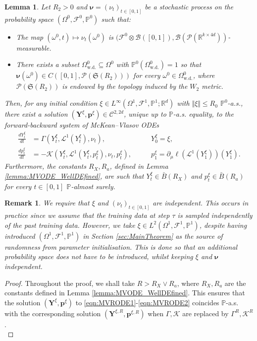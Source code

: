 \documentclass{article}
\newtheorem{lemma}[theorem]{Lemma}
\newtheorem{remark}[theorem]{Remark}
\newcommand{\R}{\mathbb{R}}
\begin{document}
\begin{appendices}
\begin{lemma}\label{lemma:MVRODE_wd}
  Let $R_2>0$ and $\bm\nu=(\nu_t)_{t\in[0,1]}$ be a stochastic process on the probability space $(\Omega^0,\mathcal F^0,\mathbb P^0)$ such that:
\begin{itemize}
    \item The map $(\omega^0,t) \mapsto \nu_t(\omega^0)$ is $(\mathcal F^0\otimes \mathcal B([0,1]), \mathcal B(\mathcal P(\R^{k\times 4d}))$-measurable.
    \item There exists a subset $\Omega^0_\mathrm{w.d.}\subseteq\Omega^0$ with $\mathbb P^0(\Omega^0_\mathrm{w.d.})=1$ so that $\bm\nu(\omega^0)\in C([0,1],\mathcal P(\mathfrak{S}(R_2)) )$ for every $\omega^0\in \Omega^0_\mathrm{w.d.}$, where $\mathcal P(\mathfrak S(R_2))$ is endowed by the topology induced by the $W_2$ metric.
\end{itemize}
Then, for any initial condition $\xi\in L^\infty(\Omega^1,\mathcal F^1,\mathbb P^1;\R^d)$ with $\Vert \xi\Vert \le R_0$ $\mathbb P^0$-a.s., there exist a solution $(\bm{Y}^\xi,\bm{p}^\xi)\in \mathscr{C}^{2,2d}$, unique up to $\mathbb P$-a.s. equality, to the forward-backward system of McKean--Vlasov ODEs
\begin{align}
    \frac{dY^{\xi}_t}{dt} &= \Gamma(Y^\xi_t,\mathcal L^1(Y^\xi_t),\nu_t), \qquad &Y^\xi_0 =\xi,\label{eqn:MVRODE1}\\
    \frac{d p^{\xi}_t}{dt} &= - \mathcal K(Y^\xi_t,\mathcal L^1(Y^\xi_t,p^\xi_t),\nu_t,p^\xi_t), \qquad &p^\xi_1 = \partial_\mu\ell(\mathcal L^1(Y^\xi_1))(Y^\xi_1).\label{eqn:MVRODE2}
\end{align}
Furthermore, the constants $R_X,R_a$, defined in Lemma \ref{lemma:MVODE_WellDEfined}, are such that $Y_t^\xi\in \bar B(R_X)$ and $p^\xi_t\in \bar B(R_a)$ for every $t\in[0,1]$ $\mathbb P$-almost surely.
\end{lemma}
\begin{remark}
We require that $\xi$ and $(\nu_t)_{t\in[0,1]}$ are independent. This occurs in practice since we assume that the training data at step $\tau$ is sampled independently of the past training data. However,
    we take $\xi\in L^2(\Omega^1,\mathcal F^1,\mathbb P^1)$, despite having introduced $(\Omega^1,\mathcal F^1,\mathbb P^1)$ in Section \ref{sec:MainTheorem} as the source of randomness from parameter initialisation. This is done so that an additional probability space does not have to be introduced, whilst keeping  $\xi$ and $\bm\nu$ independent. 
\end{remark}
\begin{proof}
Throughout the proof, we shall take $R> R_X \vee R_a$, where $R_X,R_a$ are the constants defined in Lemma \ref{lemma:MVODE_WellDEfined}. This ensures that the solution $(\bm Y^\xi,\bm p^\xi)$ to \eqref{eqn:MVRODE1}-\eqref{eqn:MVRODE2} coincides $\mathbb P$-a.s. with the corresponding solution $(\bm Y^{\xi,R},\bm p^{\xi,R})$ when $\Gamma,\mathcal K$ are replaced by $\Gamma^R,\mathcal K^R$.\\


\end{proof}
\end{appendices}
\end{document}
